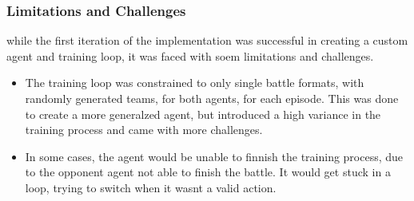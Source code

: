 \subsubsection{Limitations and Challenges}
while the first iteration of the implementation was successful in creating a custom agent
and training loop, it was faced with soem limitations and challenges.
\begin{itemize}
    \item The training loop was constrained to only single battle formats, with
    randomly generated teams, for both agents, for each episode. This was done to create a
    more generalzed agent, but introduced a high variance in the training process and came with more challenges.
    \item In some cases, the agent would be unable to finnish the training process, due to the 
    opponent agent not able to finish the battle. It would get stuck in a loop, trying to switch when it
    wasnt a valid action.
\end{itemize}